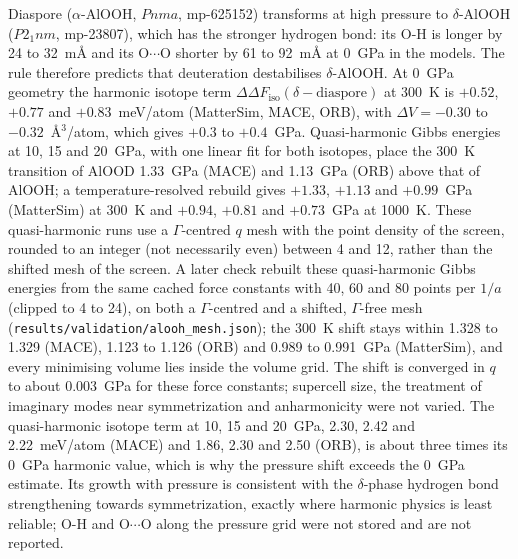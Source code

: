 \documentclass[aps,prmaterials,reprint,superscriptaddress,nofootinbib]{revtex4-2}
\newcommand{\ddF}{\Delta\Delta F_{\mathrm{iso}}}
\begin{document}
Diaspore ($\alpha$-AlOOH, $Pnma$, mp-625152) transforms at high pressure to $\delta$-AlOOH ($P2_1nm$, mp-23807), which has the stronger hydrogen bond: its O-H is longer by 24 to 32~m\AA{} and its O$\cdots$O shorter by 61 to 92~m\AA{} at 0~GPa in the models. The rule therefore predicts that deuteration destabilises $\delta$-AlOOH. At 0~GPa geometry the harmonic isotope term $\ddF(\delta - \mathrm{diaspore})$ at 300~K is $+0.52$, $+0.77$ and $+0.83$~meV/atom (MatterSim, MACE, ORB), with $\Delta V = -0.30$ to $-0.32$~\AA$^3$/atom, which gives $+0.3$ to $+0.4$~GPa. Quasi-harmonic Gibbs energies at 10, 15 and 20~GPa, with one linear fit for both isotopes, place the 300~K transition of AlOOD 1.33~GPa (MACE) and 1.13~GPa (ORB) above that of AlOOH; a temperature-resolved rebuild gives $+1.33$, $+1.13$ and $+0.99$~GPa (MatterSim) at 300~K and $+0.94$, $+0.81$ and $+0.73$~GPa at 1000~K. These quasi-harmonic runs use a $\Gamma$-centred $q$ mesh with the point density of the screen, rounded to an integer (not necessarily even) between 4 and 12, rather than the shifted mesh of the screen. A later check rebuilt these quasi-harmonic Gibbs energies from the same cached force constants with 40, 60 and 80 points per $1/a$ (clipped to 4 to 24), on both a $\Gamma$-centred and a shifted, $\Gamma$-free mesh (\texttt{results/validation/alooh\_mesh.json}); the 300~K shift stays within 1.328 to 1.329 (MACE), 1.123 to 1.126 (ORB) and 0.989 to 0.991~GPa (MatterSim), and every minimising volume lies inside the volume grid. The shift is converged in $q$ to about 0.003~GPa for these force constants; supercell size, the treatment of imaginary modes near symmetrization and anharmonicity were not varied. The quasi-harmonic isotope term at 10, 15 and 20~GPa, 2.30, 2.42 and 2.22~meV/atom (MACE) and 1.86, 2.30 and 2.50 (ORB), is about three times its 0~GPa harmonic value, which is why the pressure shift exceeds the 0~GPa estimate. Its growth with pressure is consistent with the $\delta$-phase hydrogen bond strengthening towards symmetrization, exactly where harmonic physics is least reliable; O-H and O$\cdots$O along the pressure grid were not stored and are not reported.
\end{document}
